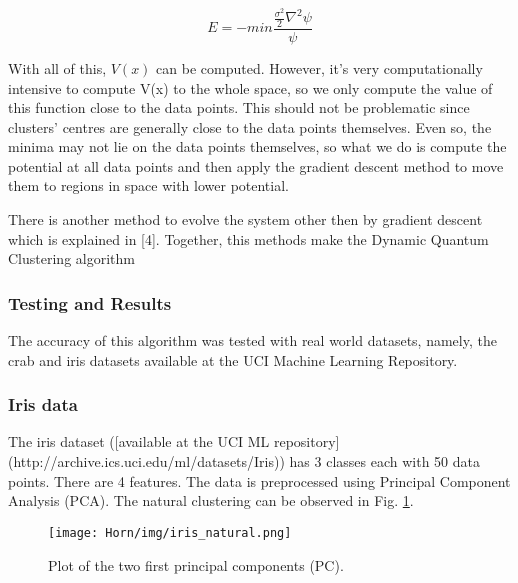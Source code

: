 \documentclass[10pt,a4paper,final]{article}
\begin{document}
$$
E = - min \frac {\frac{\sigma^2}{2}\nabla^2 \psi }{\psi}
$$

With all of this, $V(x)$ can be computed. However, it's very computationally intensive to compute V(x) to the whole space, so we only compute the value of this function close to the data points. This should not be problematic since clusters' centres are generally close to the data points themselves. Even so, the minima may not lie on the data points themselves, so what we do is compute the potential at all data points and then apply the gradient descent method to move them to regions in space with lower potential.

There is another method to evolve the system other then by gradient descent which is explained in [4]. Together, this methods make the Dynamic Quantum Clustering algorithm %


\subsubsection{Testing and Results}




The accuracy of this algorithm was tested with real world datasets, namely, the crab and iris datasets available at the UCI Machine Learning Repository.


\subsubsection{Iris data}
\label{sec:horn_iris}
The iris dataset ([available at the UCI ML repository](http://archive.ics.uci.edu/ml/datasets/Iris)) has 3 classes each with 50 data points. There are 4 features. The data is preprocessed using Principal Component Analysis (PCA). The natural clustering can be observed in Fig. \ref{fig:iris_natural}. 


\begin{figure}[hbtp]
\centering
\texttt{[image: Horn/img/iris\_natural.png]}
\caption{Plot of the two first principal components (PC).}
\label{fig:iris_natural}

\end{figure}
\end{document}
